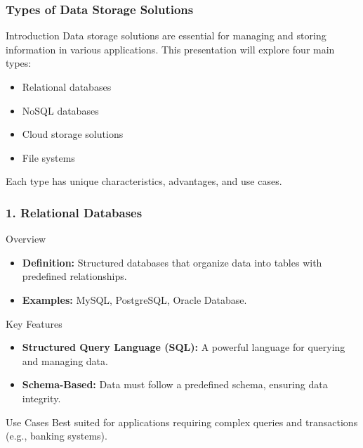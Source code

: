 \documentclass[aspectratio=169]{beamer}
\begin{document}
\begin{frame}[fragile]
    \frametitle{Types of Data Storage Solutions}
    \begin{block}{Introduction}
        Data storage solutions are essential for managing and storing information in various applications. This presentation will explore four main types: 
        \begin{itemize}
            \item Relational databases
            \item NoSQL databases
            \item Cloud storage solutions
            \item File systems
        \end{itemize}
        Each type has unique characteristics, advantages, and use cases.
    \end{block}
\end{frame}

\begin{frame}[fragile]
    \frametitle{1. Relational Databases}
    \begin{block}{Overview}
        \begin{itemize}
            \item \textbf{Definition:} Structured databases that organize data into tables with predefined relationships.
            \item \textbf{Examples:} MySQL, PostgreSQL, Oracle Database.
        \end{itemize}
    \end{block}

    \begin{block}{Key Features}
        \begin{itemize}
            \item \textbf{Structured Query Language (SQL):} A powerful language for querying and managing data.
            \item \textbf{Schema-Based:} Data must follow a predefined schema, ensuring data integrity.
        \end{itemize}
    \end{block}

    \begin{block}{Use Cases}
        Best suited for applications requiring complex queries and transactions (e.g., banking systems).
    \end{block}
\end{frame}
\end{document}
